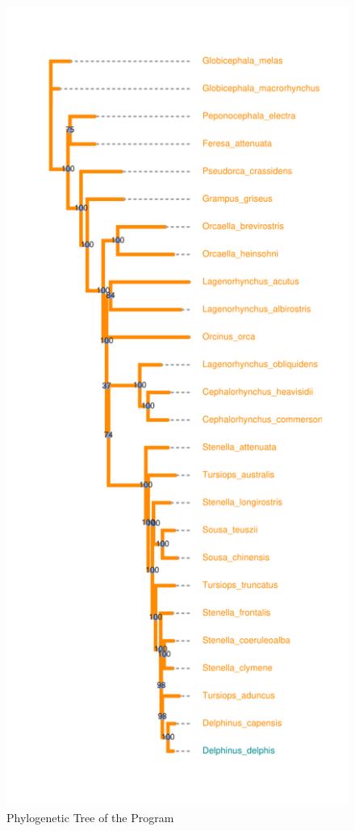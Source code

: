 \documentclass[12pt]{article}
\begin{document}
\begin{figure}
    \centering
    \includegraphics[scale = 0.9]{Arvoress-1.png}
    \caption{Phylogenetic Tree of the Program}
    \label{fig:ourPhy}
\end{figure}
\end{document}
